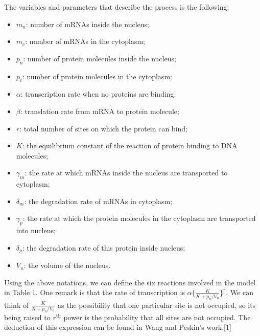 \documentclass[12pt]{article}
\renewcommand{\(}{\left (}
\renewcommand{\)}{\right )}
\begin{document}
The variables and parameters that describe the process is the following:
\begin{itemize}
  \item $m_n$: number of mRNAs inside the nucleus;
  \item $m_c$: number of mRNAs in the cytoplasm;
  \item $p_n$: number of protein molecules inside the nucleus;
  \item $p_c$: number of protein molecules in the cytoplasm;
  \item $\alpha$: transcription rate when no proteins are binding;
  \item $\beta$: translation rate from mRNA to protein molecule;
  \item $r$: total number of sites on which the protein can bind;
  \item $K$: the equilibrium constant of the reaction of protein binding to DNA molecules;
  \item $\gamma_m$: the rate at which mRNAs inside the nucleus are transported to cytoplasm;
  \item $\delta_m$: the degradation rate of mRNAs in cytoplasm;
  \item $\gamma_p$: the rate at which the protein molecules in the cytoplasm are transported into nucleus;
  \item $\delta_p$: the degradation rate of this protein inside nucleus;
	\item $V_n$: the volume of the nucleus.
\end{itemize}

Using the above notations, we can define the six reactions involved in the model in Table 1. One remark is that the rate of transcription is $\alpha \{\frac{K}{K + p_n / V_n}\}^r.$ We can think of $\frac{K}{K + p_n / V_n}$ as the possibility that one particular site is not occupied, so its being raised to $r^\text{th}$ power is the probability that all sites are not occupied. The deduction of this expression can be found in Wang and Peskin's work.[1]
\end{document}
